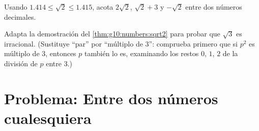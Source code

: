 \begin{exercise}[$\star\star$]\label{exo:g10:numbers:9}
Usando $1.414 \leq \sqrt 2 \leq 1.415$, acota $2\sqrt2$, $\sqrt2 + 3$ y
$-\sqrt2$ entre dos números decimales.
\end{exercise}

\begin{exercise}[$\star\star\star$]\label{exo:g10:numbers:10}
Adapta la demostración del \cref{thm:g10:numbers:sqrt2} para probar que
$\sqrt 3$ es irracional. (Sustituye ``par'' por ``múltiplo de $3$'':
comprueba primero que si $p^2$ es múltiplo de $3$, entonces $p$ también lo
es, examinando los restos $0$, $1$, $2$ de la división de $p$ entre $3$.)
\end{exercise}

\section{Problema: Entre dos números cualesquiera}

